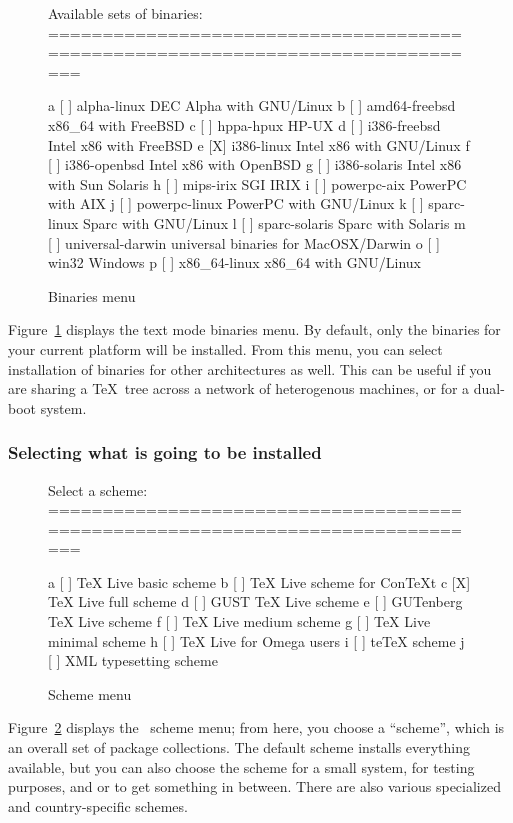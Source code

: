 \documentclass{article}
\begin{document}
\begin{figure}[tbh]
\begin{boxedverbatim}
Available sets of binaries:
===============================================================================

   a [ ] alpha-linux      DEC Alpha with GNU/Linux
   b [ ] amd64-freebsd    x86_64 with FreeBSD
   c [ ] hppa-hpux        HP-UX
   d [ ] i386-freebsd     Intel x86 with FreeBSD
   e [X] i386-linux       Intel x86 with GNU/Linux
   f [ ] i386-openbsd     Intel x86 with OpenBSD
   g [ ] i386-solaris     Intel x86 with Sun Solaris
   h [ ] mips-irix        SGI IRIX
   i [ ] powerpc-aix      PowerPC with AIX
   j [ ] powerpc-linux    PowerPC with GNU/Linux
   k [ ] sparc-linux      Sparc with GNU/Linux
   l [ ] sparc-solaris    Sparc with Solaris
   m [ ] universal-darwin universal binaries for MacOSX/Darwin
   o [ ] win32            Windows
   p [ ] x86_64-linux     x86_64 with GNU/Linux
\end{boxedverbatim}
\caption{Binaries menu}\label{fig:bin-text}
\end{figure}

Figure~\ref{fig:bin-text} displays the text mode binaries menu.  By
default, only the binaries for your current platform will be installed.
From this menu, you can select installation of binaries for other
architectures as well.  This can be useful if you are sharing a \TeX\
tree across a network of heterogenous machines, or for a dual-boot
system.

\subsubsection{Selecting what is going to be installed}
\label{sec:components}

\begin{figure}[tbh]
\begin{boxedverbatim}
Select a scheme:
===============================================================================

 a [ ] TeX Live basic scheme
 b [ ] TeX Live scheme for ConTeXt
 c [X] TeX Live full scheme
 d [ ] GUST TeX Live scheme
 e [ ] GUTenberg TeX Live scheme
 f [ ] TeX Live medium scheme
 g [ ] TeX Live minimal scheme
 h [ ] TeX Live for Omega users
 i [ ] teTeX scheme
 j [ ] XML typesetting scheme
\end{boxedverbatim}
\caption{Scheme menu}\label{fig:scheme-text}
\end{figure}

Figure~\ref{fig:scheme-text} displays the \TL\ scheme menu; from here,
you choose a ``scheme'', which is an overall set of package collections.
The default \optname{full} scheme installs everything available, but you
can also choose the \optname{basic} scheme for a small system,
 for testing purposes, and  or
 to get something in between.  There are also various
specialized and country-specific schemes.
\end{document}
